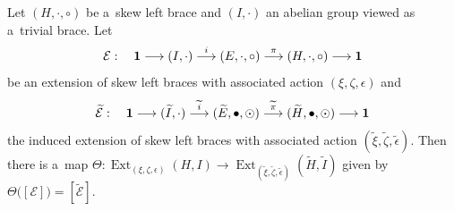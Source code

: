 \documentclass{jonasart}
\theoremstyle{plain}
\DeclareMathOperator{\Ext}{Ext}
\begin{document}
	\begin{corollary}\label{extsb-extdoublesb}
		Let $(H,\cdot,\circ)$ be a~skew left brace and $(I,\cdot)$ an abelian group viewed as a~trivial brace. Let
		\[
		\mathcal{E} : \quad  {\bf 1} \longrightarrow (I,\cdot) \stackrel{i}{\longrightarrow}  (E,\cdot,\circ) \stackrel{\pi}{\longrightarrow} (H,\cdot,\circ) \longrightarrow {\bf 1}
		\]
		be an extension of skew left braces with associated action $(\xi,\zeta,\epsilon)$ and
		\[
		\widetilde{\mathcal{E}}: \quad  {\bf 1} \longrightarrow (\widetilde{I},\cdot) \stackrel{\widetilde{i}}{\longrightarrow}  (\widetilde{E},\bullet,\odot) \stackrel{\widetilde{\pi}}{\longrightarrow} (\widetilde{H},\bullet,\odot) \longrightarrow {\bf 1}
		\]
		the induced extension of skew left braces with associated action $(\widetilde{\xi},\widetilde{\zeta},\widetilde{\epsilon})$. Then there is a~map
		$\Theta: \Ext_{(\xi,\zeta,\epsilon)}(H, I) \to \Ext_{(\widetilde{\xi},\widetilde{\zeta},\widetilde{\epsilon})}(\widetilde{H}, \widetilde{I})$ given by $\Theta\big([\mathcal{E}] \big)= [\widetilde{\mathcal{E}}]$.
	\end{corollary}
	
\end{document}
